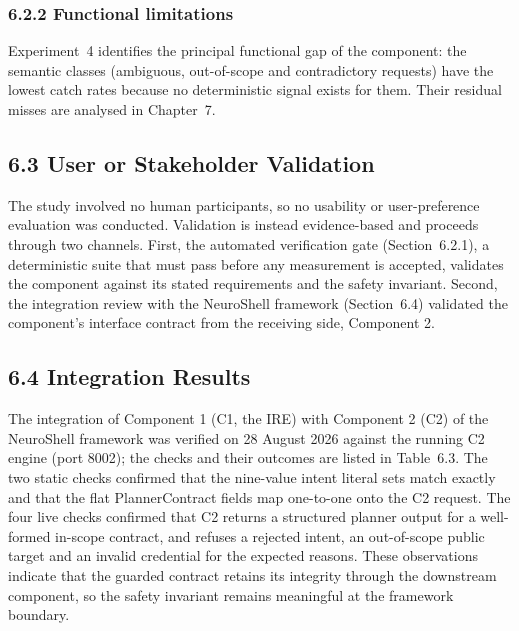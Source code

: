 \documentclass[
]{article}
\begin{document}
\hypertarget{functional-limitations}{%
\subsubsection{6.2.2 Functional
limitations}\label{functional-limitations}}

Experiment~4 identifies the principal functional gap of the component:
the semantic classes (ambiguous, out-of-scope and contradictory
requests) have the lowest catch rates because no deterministic signal
exists for them. Their residual misses are analysed in Chapter~7.

\hypertarget{user-or-stakeholder-validation}{%
\subsection{6.3 User or Stakeholder
Validation}\label{user-or-stakeholder-validation}}

The study involved no human participants, so no usability or
user-preference evaluation was conducted. Validation is instead
evidence-based and proceeds through two channels. First, the automated
verification gate (Section~6.2.1), a deterministic suite that must pass
before any measurement is accepted, validates the component against its
stated requirements and the safety invariant. Second, the integration
review with the NeuroShell framework (Section~6.4) validated the
component's interface contract from the receiving side, Component 2.

\hypertarget{integration-results}{%
\subsection{6.4 Integration Results}\label{integration-results}}

The integration of Component 1 (C1, the IRE) with Component 2 (C2) of
the NeuroShell framework was verified on 28 August 2026 against the
running C2 engine (port 8002); the checks and their outcomes are listed
in Table~6.3. The two static checks confirmed that the nine-value intent
literal sets match exactly and that the flat PlannerContract fields map
one-to-one onto the C2 request. The four live checks confirmed that C2
returns a structured planner output for a well-formed in-scope contract,
and refuses a rejected intent, an out-of-scope public target and an
invalid credential for the expected reasons. These observations indicate
that the guarded contract retains its integrity through the downstream
component, so the safety invariant remains meaningful at the framework
boundary.
\end{document}
